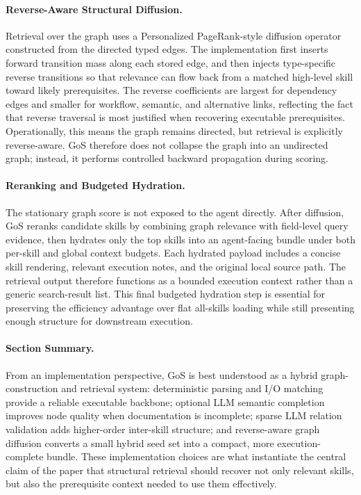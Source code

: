 \paragraph{Reverse-Aware Structural Diffusion.}
Retrieval over the graph uses a Personalized PageRank-style diffusion operator constructed from the directed typed edges. The implementation first inserts forward transition mass along each stored edge, and then injects type-specific reverse transitions so that relevance can flow back from a matched high-level skill toward likely prerequisites. The reverse coefficients are largest for dependency edges and smaller for workflow, semantic, and alternative links, reflecting the fact that reverse traversal is most justified when recovering executable prerequisites. Operationally, this means the graph remains directed, but retrieval is explicitly reverse-aware. GoS therefore does not collapse the graph into an undirected graph; instead, it performs controlled backward propagation during scoring.

\paragraph{Reranking and Budgeted Hydration.}
The stationary graph score is not exposed to the agent directly. After diffusion, GoS reranks candidate skills by combining graph relevance with field-level query evidence, then hydrates only the top skills into an agent-facing bundle under both per-skill and global context budgets. Each hydrated payload includes a concise skill rendering, relevant execution notes, and the original local source path. The retrieval output therefore functions as a bounded execution context rather than a generic search-result list. This final budgeted hydration step is essential for preserving the efficiency advantage over flat all-skills loading while still presenting enough structure for downstream execution.

\paragraph{Section Summary.}
From an implementation perspective, GoS is best understood as a hybrid graph-construction and retrieval system: deterministic parsing and I/O matching provide a reliable executable backbone; optional LLM semantic completion improves node quality when documentation is incomplete; sparse LLM relation validation adds higher-order inter-skill structure; and reverse-aware graph diffusion converts a small hybrid seed set into a compact, more execution-complete bundle. These implementation choices are what instantiate the central claim of the paper that structural retrieval should recover not only relevant skills, but also the prerequisite context needed to use them effectively.

